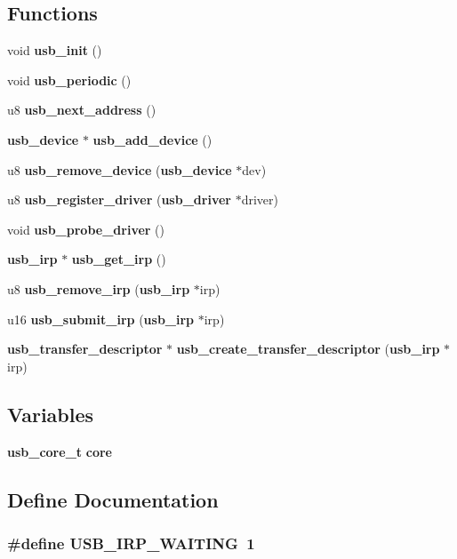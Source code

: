 \subsection*{Functions}
\begin{CompactItemize}
\item 
void {\bf usb\_\-init} ()
\item 
void {\bf usb\_\-periodic} ()
\item 
u8 {\bf usb\_\-next\_\-address} ()
\item 
{\bf usb\_\-device} $\ast$ {\bf usb\_\-add\_\-device} ()
\item 
u8 {\bf usb\_\-remove\_\-device} ({\bf usb\_\-device} $\ast$dev)
\item 
u8 {\bf usb\_\-register\_\-driver} ({\bf usb\_\-driver} $\ast$driver)
\item 
void {\bf usb\_\-probe\_\-driver} ()
\item 
{\bf usb\_\-irp} $\ast$ {\bf usb\_\-get\_\-irp} ()
\item 
u8 {\bf usb\_\-remove\_\-irp} ({\bf usb\_\-irp} $\ast$irp)
\item 
u16 {\bf usb\_\-submit\_\-irp} ({\bf usb\_\-irp} $\ast$irp)
\item 
{\bf usb\_\-transfer\_\-descriptor} $\ast$ {\bf usb\_\-create\_\-transfer\_\-descriptor} ({\bf usb\_\-irp} $\ast$irp)
\end{CompactItemize}
\subsection*{Variables}
\begin{CompactItemize}
\item 
{\bf usb\_\-core\_\-t} {\bf core}
\end{CompactItemize}


\subsection{Define Documentation}
\subsubsection{\setlength{\rightskip}{0pt plus 5cm}\#define USB\_\-IRP\_\-WAITING~1}\label{core_8h_f944ea9c1c344120b6a76b558d17502f}


